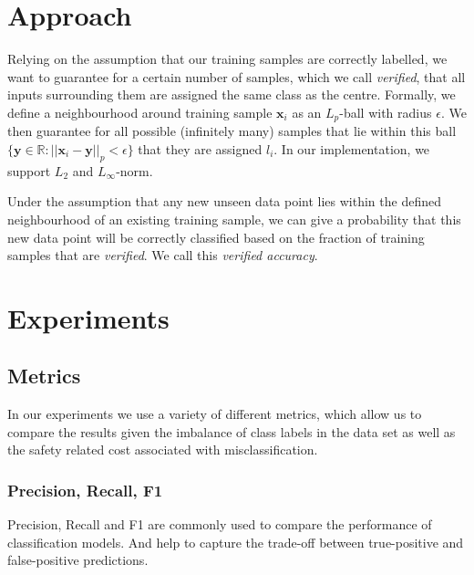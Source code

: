 \documentclass[acmsmall,nonacm]{acmart}
\begin{document}
\section{Approach} \label{sec:approach}


Relying on the assumption that our training samples are correctly labelled, we want to guarantee for a certain number of samples, which we call \textit{verified}, that all inputs surrounding them are assigned the same class as the centre. Formally, we define a neighbourhood around training sample $\mathbf{x}_i$ as an $L_p$-ball with radius $\epsilon$. We then guarantee for all possible (infinitely many) samples that lie within this ball $\{\mathbf{y} \in \mathbb{R}: ||\mathbf{x}_i - \mathbf{y}||_p < \epsilon \}$ that they are assigned $l_i$. In our implementation, we support $L_2$ and $L_\infty$-norm.

Under the assumption that any new unseen data point lies within the defined neighbourhood of an existing training sample, we can give a probability that this new data point will be correctly classified based on the fraction of training samples that are \textit{verified}. We call this \textit{verified accuracy}.

\section{Experiments}

\subsection{Metrics}
In our experiments we use a variety of different metrics, which allow us to compare the results given the imbalance of class labels in the data set as well as the safety related cost associated with misclassification.


\subsubsection{Precision, Recall, F1}
Precision, Recall and F1 are commonly used to compare the performance of classification models. And help to capture the trade-off between true-positive and false-positive predictions. 
\end{document}
